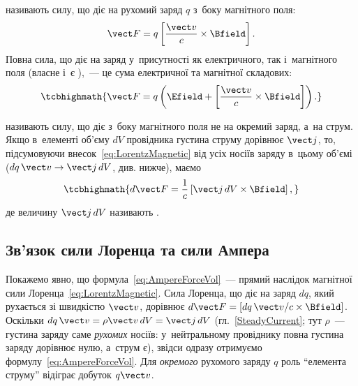  називають силу, що діє на рухомий заряд $q$
з~боку магнітного поля:
\begin{equation}\label{eq:LorentzMagnetic}
	\vect F = q\left[\frac{\vect v}{c}\times\Bfield\right].
\end{equation}
Повна сила, що діє на заряд у~присутності як електричного, так і~магнітного поля (власне
і~є ),~--- це сума електричної та магнітної складових:
\begin{equation*}
	\tcbhighmath{
		\vect F = q\left(\Efield + \left[\frac{\vect v}{c}\times\Bfield\right]\right).
	}
\end{equation*}

 називають силу, що діє з~боку магнітного поля не на окремий заряд,
а~на струм. Якщо в~елементі об'єму $dV$ провідника густина струму дорівнює $\vect j$, то,
підсумовуючи внесок~\eqref{eq:LorentzMagnetic} від усіх носіїв заряду в~цьому об'ємі
($dq\,\vect v \to \vect j\, dV$, див. нижче), маємо
\begin{equation}\label{eq:AmpereForceVol}
	\tcbhighmath{
		d\vect F = \frac1c\left[\vect j\, dV\times\Bfield\right],
	}
\end{equation}
де величину $\vect j\, dV$ називають .


\subsection*{Зв'язок сили Лоренца та сили Ампера}


Покажемо явно, що формула~\eqref{eq:AmpereForceVol}~--- прямий наслідок магнітної сили
Лоренца~\eqref{eq:LorentzMagnetic}. Сила Лоренца, що діє на заряд $dq$, який рухається зі
швидкістю $\vect v$, дорівнює $d\vect F = \left[dq\,\vect v/c \times\Bfield\right]$.
Оскільки $dq\,\vect v = \rho\vect v\, dV = \vect j\, dV$ (гл.~\ref{SteadyCurrent}; тут
$\rho$~--- густина заряду саме \emph{рухомих} носіїв: у~нейтральному провіднику повна
густина заряду дорівнює нулю, а~струм є), звідси одразу отримуємо
формулу~\eqref{eq:AmpereForceVol}. Для \emph{окремого} рухомого заряду $q$ роль
\enquote{елемента струму} відіграє добуток $q\vect v$.



